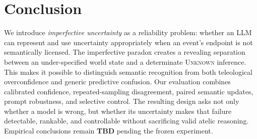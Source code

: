 \documentclass[letterpaper]{article}
\begin{document}
\section{Conclusion}
We introduce \emph{imperfective uncertainty} as a reliability problem: whether an LLM can represent and use uncertainty appropriately when an event's endpoint is not semantically licensed. The imperfective paradox creates a revealing separation between an under-specified world state and a determinate \textsc{Unknown} inference. This makes it possible to distinguish semantic recognition from both teleological overconfidence and generic predictive confusion. Our evaluation combines calibrated confidence, repeated-sampling disagreement, paired semantic updates, prompt robustness, and selective control. The resulting design asks not only whether a model is wrong, but whether its uncertainty makes that failure detectable, rankable, and controllable without sacrificing valid atelic reasoning. Empirical conclusions remain \textbf{TBD} pending the frozen experiment.


\end{document}
